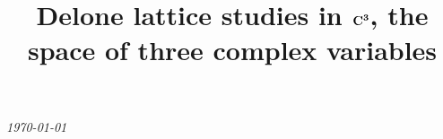 \documentclass[]{iucr}              %
\numberwithin{equation}{section}
\newcommand{\CIII}[0]{$\bf{C^{3}}$}
\begin{document}
	
	
	
	
	
	
	
	
	
	
	
	{\LARGE \emph{\today}} \\
	\title{Delone lattice studies in \CIII, the space of three complex variables}
	
	
\end{document}
